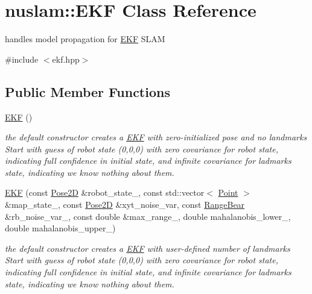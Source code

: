 \hypertarget{classnuslam_1_1EKF}{}\section{nuslam\+:\+:E\+KF Class Reference}
\label{classnuslam_1_1EKF}


handles model propagation for \hyperlink{classnuslam_1_1EKF}{E\+KF} S\+L\+AM  




{\ttfamily \#include $<$ekf.\+hpp$>$}

\subsection*{Public Member Functions}
\begin{DoxyCompactItemize}
\item 
\mbox{\label{classnuslam_1_1EKF_a459ca7cecbb8457d805da0b916063d57}} 
\hyperlink{classnuslam_1_1EKF_a459ca7cecbb8457d805da0b916063d57}{E\+KF} ()
\begin{DoxyCompactList}\small\item\em the default constructor creates a \hyperlink{classnuslam_1_1EKF}{E\+KF} with zero-\/initialized pose and no landmarks Start with guess of robot state (0,0,0) with zero covariance for robot state, indicating full confidence in initial state, and infinite covariance for ladmarks state, indicating we know nothing about them. \end{DoxyCompactList}\item 
\mbox{\label{classnuslam_1_1EKF_ac47ec7f4a91c3ed3f6b8fba4167354c9}} 
\hyperlink{classnuslam_1_1EKF_ac47ec7f4a91c3ed3f6b8fba4167354c9}{E\+KF} (const \hyperlink{structrigid2d_1_1Pose2D}{Pose2D} \&robot\+\_\+state\+\_\+, const std\+::vector$<$ \hyperlink{structnuslam_1_1Point}{Point} $>$ \&map\+\_\+state\+\_\+, const \hyperlink{structrigid2d_1_1Pose2D}{Pose2D} \&xyt\+\_\+noise\+\_\+var, const \hyperlink{structnuslam_1_1RangeBear}{Range\+Bear} \&rb\+\_\+noise\+\_\+var\+\_\+, const double \&max\+\_\+range\+\_\+, double mahalanobis\+\_\+lower\+\_\+, double mahalanobis\+\_\+upper\+\_\+)
\begin{DoxyCompactList}\small\item\em the default constructor creates a \hyperlink{classnuslam_1_1EKF}{E\+KF} with user-\/defined number of landmarks Start with guess of robot state (0,0,0) with zero covariance for robot state, indicating full confidence in initial state, and infinite covariance for ladmarks state, indicating we know nothing about them. \end{DoxyCompactList}\item 

\end{DoxyCompactItemize}
